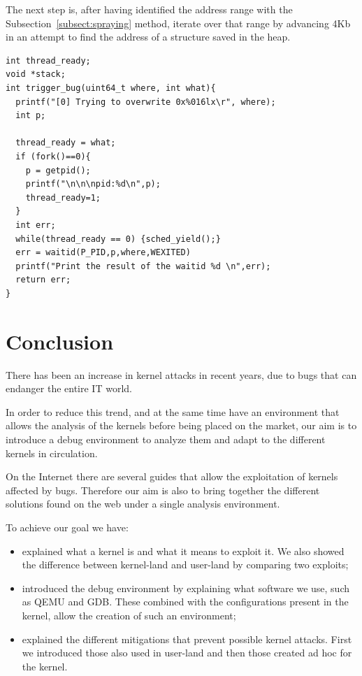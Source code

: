 \documentclass{masterthesis}
\newcommand{\refToSubSection}[1]{Subsection~\ref{subsect:#1}\xspace}
\begin{document}
The next step is, after having identified the address range with the \refToSubSection{spraying} method, iterate over that range by advancing 4Kb in an attempt to find the address of a structure saved in the heap.
\begin{lstlisting}
int thread_ready;
void *stack;
int trigger_bug(uint64_t where, int what){
  printf("[0] Trying to overwrite 0x%016lx\r", where);
  int p;
  
  thread_ready = what;
  if (fork()==0){
    p = getpid();
    printf("\n\n\npid:%d\n",p);
    thread_ready=1;
  }
  int err;
  while(thread_ready == 0) {sched_yield();}
  err = waitid(P_PID,p,where,WEXITED)
  printf("Print the result of the waitid %d \n",err);  
  return err;
}
\end{lstlisting}
\chapter{Conclusion}
There has been an increase in kernel attacks in recent years, due to bugs that can endanger the entire IT world.

In order to reduce this trend, and at the same time have an environment that allows the analysis of the kernels before being placed on the market, our aim is to introduce a debug environment to analyze them and adapt to the different kernels in circulation.

On the Internet there are several guides that allow the exploitation of kernels affected by bugs. Therefore our aim is also to bring together the different solutions found on the web under a single analysis environment.

To achieve our goal we have:
\begin{itemize}
\item explained what a kernel is and what it means to exploit it.  We also showed the difference between kernel-land and user-land by comparing two exploits;
\item introduced the debug environment by explaining what software we use, such as QEMU and GDB.  These combined with the configurations present in the kernel, allow the creation of such an environment;
\item explained the different mitigations that prevent possible kernel attacks.  First we introduced those also used in user-land and then those created ad hoc for the kernel.
\end{itemize}
\end{document}
